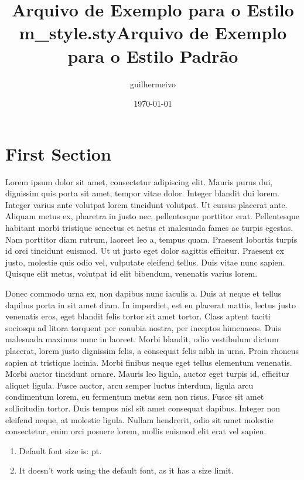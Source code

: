 \documentclass[12pt]{article}
\title{Arquivo de Exemplo para o Estilo m\_style.sty}
\title{Arquivo de Exemplo para o Estilo Padrão}
\author{guilhermeivo}
\date{\today}
\begin{document}
\maketitle
\cleardoublepage


\section{First Section}

Lorem ipsum dolor sit amet, consectetur adipiscing elit. Mauris purus dui, dignissim quis porta sit amet, tempor vitae dolor. Integer blandit dui lorem. Integer varius ante volutpat lorem tincidunt volutpat. Ut cursus placerat ante. Aliquam metus ex, pharetra in justo nec, pellentesque porttitor erat. Pellentesque habitant morbi tristique senectus et netus et malesuada fames ac turpis egestas. Nam porttitor diam rutrum, laoreet leo a, tempus quam. Praesent lobortis turpis id orci tincidunt euismod. Ut ut justo eget dolor sagittis efficitur. Praesent ex justo, molestie quis odio vel, vulputate eleifend tellus. Duis vitae nunc sapien. Quisque elit metus, volutpat id elit bibendum, venenatis varius lorem.

Donec commodo urna ex, non dapibus nunc iaculis a. Duis at neque et tellus dapibus porta in sit amet diam. In imperdiet, est eu placerat mattis, lectus justo venenatis eros, eget blandit felis tortor sit amet tortor. Class aptent taciti sociosqu ad litora torquent per conubia nostra, per inceptos himenaeos. Duis malesuada maximus nunc in laoreet. Morbi blandit, odio vestibulum dictum placerat, lorem justo dignissim felis, a consequat felis nibh in urna. Proin rhoncus sapien at tristique lacinia. Morbi finibus neque eget tellus elementum venenatis. Morbi auctor tincidunt ornare. Mauris leo ligula, auctor eget turpis id, efficitur aliquet ligula. Fusce auctor, arcu semper luctus interdum, ligula arcu condimentum lorem, eu fermentum metus sem non risus. Fusce sit amet sollicitudin tortor. Duis tempus nisl sit amet consequat dapibus. Integer non eleifend neque, at molestie ligula. Nullam hendrerit, odio sit amet molestie consectetur, enim orci posuere lorem, mollis euismod elit erat vel sapien.

\begin{enumerate}
    \item Default font size is: \makeatletter\f@size\makeatother pt.
    
    \item It doesn't work using the default font, as it has a size limit.
\end{enumerate}    
\end{document}
